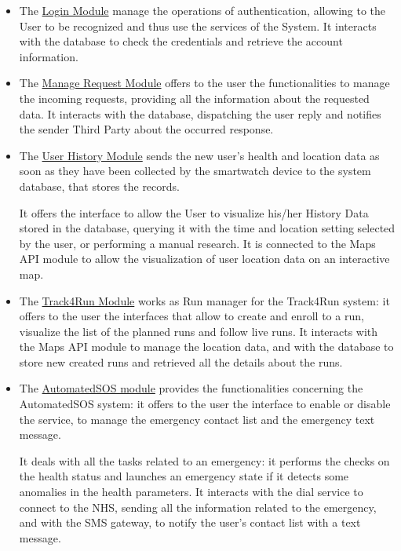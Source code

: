 \begin{itemize}
    \item The \underline{Login Module}  manage the operations of authentication, allowing to the User to be recognized and thus use the services of the System. It interacts with the database to check the credentials and retrieve the account information.
    
    
    \item The \underline{Manage Request Module} offers to the user the functionalities to manage the incoming requests, providing all the information about the requested data. It interacts with the database, dispatching the user reply and notifies the sender Third Party about the occurred response.
    
    
    
    \item The \underline{User History Module} sends the new user's health and location data as soon as they have been collected by the smartwatch device  to the system database, that stores the records.
    
    It offers the interface to allow the User to visualize his/her History Data stored in the database, querying it with the time and location setting selected by the user, or performing a manual research. It is connected to the Maps API module to allow the visualization of user location data on an interactive map.
    
    
    \item The \underline{Track4Run Module} works as Run manager for the Track4Run system: it offers to the user the interfaces that allow to create and enroll to a run, visualize the list of the planned runs and follow live runs. It interacts with the Maps API module to manage the location data, and with the database to store new created runs and retrieved all the details about the runs. 
    
    \item The \underline{AutomatedSOS module} provides the functionalities concerning the AutomatedSOS system: it offers to the user the interface to enable or disable the service, to manage the emergency contact list and the emergency text message.
    
    It deals with all the tasks related to an emergency: it performs the checks on the health status and launches  an emergency state if it detects some anomalies in the health parameters. It interacts with the dial service to connect to the NHS, sending all the information related to the emergency, and with the SMS gateway, to notify the user's contact list with a text message.
    
    
    
\end{itemize}